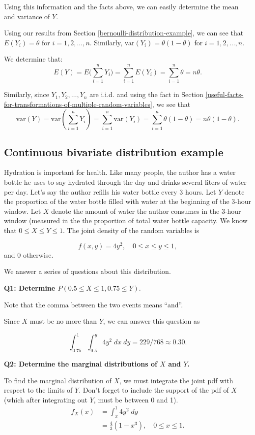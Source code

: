 \documentclass[
]{book}
\theoremstyle{definition}
\theoremstyle{definition}
\theoremstyle{definition}
\theoremstyle{definition}
\theoremstyle{remark}
\begin{document}
Using this information and the facts above, we can easily determine the mean and variance of \(Y\).

Using our results from Section \ref{bernoulli-distribution-example}, we can see that \(E(Y_i) = \theta\) for \(i=1,2,\ldots,n\). Similarly, \(\mathrm{var}(Y_i)=\theta(1-\theta)\) for \(i=1,2,\ldots,n\).

We determine that:
\[
E(Y)=E\biggl(\sum_{i=1}^n Y_i\biggr)=\sum_{i=1}^n E(Y_i) = \sum_{i=1}^n \theta = n\theta.
\]

Similarly, since \(Y_1, Y_2, \ldots, Y_n\) are i.i.d. and using the fact in Section \ref{useful-facts-for-transformations-of-multiple-random-variables}, we see that
\[
\mathrm{var}(Y) = \mathrm{var}(\sum_{i=1}^n Y_i) = \sum_{i=1}^n\mathrm{var}(Y_i)=\sum_{i=1}^n \theta(1-\theta) = n\theta(1-\theta).
\]

\hypertarget{continuous-bivariate-distribution-example}{%
\subsection{Continuous bivariate distribution example}\label{continuous-bivariate-distribution-example}}

Hydration is important for health. Like many people, the author has a water bottle he uses to say hydrated through the day and drinks several liters of water per day. Let's say the author refills his water bottle every 3 hours. Let \(Y\) denote the proportion of the water bottle filled with water at the beginning of the 3-hour window. Let \(X\) denote the amount of water the author consumes in the 3-hour window (measured in the the proportion of total water bottle capacity. We know that \(0\leq X \leq Y \leq 1\). The joint density of the random variables is

\[
f(x,y)=4y^2,\quad 0 \leq x\leq y\leq 1,
\]
and 0 otherwise.

We answer a series of questions about this distribution.

\textbf{Q1: Determine \(P(0.5\leq X\leq 1, 0.75\leq Y)\)}.

Note that the comma between the two events means ``and''.

Since \(X\) must be no more than \(Y\), we can answer this question as

\[
\int_{0.75}^{1} \int_{0.5}^{y} 4y^2\;dx\;dy=229/768\approx 0.30.
\]

\textbf{Q2: Determine the marginal distributions of \(X\) and \(Y\).}

To find the marginal distribution of \(X\), we must integrate the joint pdf with respect to the limits of \(Y\). Don't forget to include the support of the pdf of \(X\) (which after integrating out \(Y\), must be between 0 and 1).
\[
\begin{aligned}
f_X(x) &=\int_{x}^1 4y^2\;dy \\
&=\frac{4}{3}(1-x^3),\quad 0\leq x \leq 1.
\end{aligned}
\]
\end{document}
